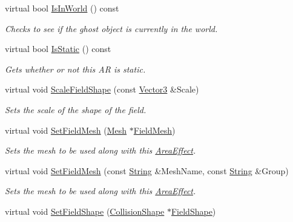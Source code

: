 \begin{DoxyCompactItemize}
virtual bool \hyperlink{classphys_1_1AreaEffect_a2ef4bb9389dd9296e680a77058609712}{IsInWorld} () const 
\begin{DoxyCompactList}\small\item\em Checks to see if the ghost object is currently in the world. \item\end{DoxyCompactList}\item 
virtual bool \hyperlink{classphys_1_1AreaEffect_aecdf8cb72c6182e2495cf25c01afc249}{IsStatic} () const 
\begin{DoxyCompactList}\small\item\em Gets whether or not this AR is static. \item\end{DoxyCompactList}\item 
virtual void \hyperlink{classphys_1_1AreaEffect_a140c51a8761f487e1c8f4e7123bb0b31}{ScaleFieldShape} (const \hyperlink{classphys_1_1Vector3}{Vector3} \&Scale)
\begin{DoxyCompactList}\small\item\em Sets the scale of the shape of the field. \item\end{DoxyCompactList}\item 
virtual void \hyperlink{classphys_1_1AreaEffect_a48516394311c44b87c0815407f88e424}{SetFieldMesh} (\hyperlink{classphys_1_1Mesh}{Mesh} $\ast$\hyperlink{classphys_1_1AreaEffect_a435c71f4871e9364c29c8d38ebfa09d1}{FieldMesh})
\begin{DoxyCompactList}\small\item\em Sets the mesh to be used along with this \hyperlink{classphys_1_1AreaEffect}{AreaEffect}. \item\end{DoxyCompactList}\item 
virtual void \hyperlink{classphys_1_1AreaEffect_a1a70f5c2eeda4fd0968de1cfa904605a}{SetFieldMesh} (const \hyperlink{namespacephys_aa03900411993de7fbfec4789bc1d392e}{String} \&MeshName, const \hyperlink{namespacephys_aa03900411993de7fbfec4789bc1d392e}{String} \&Group)
\begin{DoxyCompactList}\small\item\em Sets the mesh to be used along with this \hyperlink{classphys_1_1AreaEffect}{AreaEffect}. \item\end{DoxyCompactList}\item 
virtual void \hyperlink{classphys_1_1AreaEffect_aeaec58dcc51d5193c55693e7415ddb2f}{SetFieldShape} (\hyperlink{classphys_1_1CollisionShape}{CollisionShape} $\ast$\hyperlink{classphys_1_1AreaEffect_a444fd63345d6dbd0d4ec3ec7a289657a}{FieldShape})

\end{DoxyCompactItemize}
